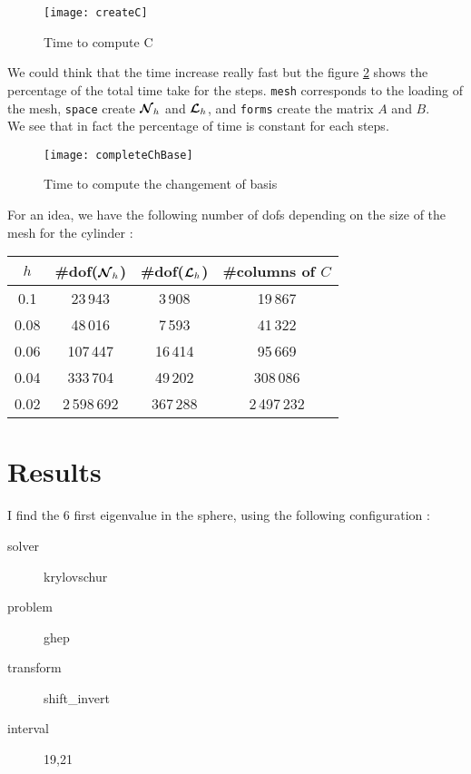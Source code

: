 \begin{figure}[H]
  \centering
  \texttt{[image: createC]}
  \caption{Time to compute C}
  \label{timeC}
\end{figure}

We could think that the time increase really fast but the figure \ref{completeTime} shows the percentage of the total time take for the steps. \texttt{mesh} corresponds to the loading of the mesh, \texttt{space} create ${\bm{\mathcal{N}}}_h$ and ${\bm{\mathcal{L}}}_h$, and \texttt{forms} create the matrix $A$ and $B$.\\
We see that in fact the percentage of time is constant for each steps.

\begin{figure}[H]
  \centering
  \texttt{[image: completeChBase]}
  \caption{Time to compute the changement of basis}
  \label{completeTime}
\end{figure}

For an idea, we have the following number of dofs depending on the size of the mesh for the cylinder :
\begin{center}
  \begin{tabular}{ c | c | c | c }
    $h$ & \#dof(${\bm{\mathcal{N}}}_h$) & \#dof(${\bm{\mathcal{L}}}_h$) & \#columns of $C$ \\ \hline
    0.1 & 23\,943 & 3\,908 & 19\,867 \\ \hline
    0.08 & 48\,016 & 7\,593 & 41\,322 \\ \hline
    0.06 & 107\,447 & 16\,414 & 95\,669 \\ \hline
    0.04 & 333\,704 & 49\,202 & 308\,086 \\ \hline
    0.02 & 2\,598\,692 & 367\,288 & 2\,497\,232 \\ \hline
  \end{tabular}
\end{center}

\section{Results}

I find the 6 first eigenvalue in the sphere, using the following configuration :
\begin{description}
\item[solver] krylovschur
\item[problem] ghep
\item[transform] shift\_invert
\item[interval] 19,21
\end{description}

